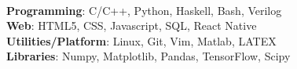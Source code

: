 \ifdefined\ONEPAGE
\\
\textbf{Programming}: C/C++, Python, Haskell, Bash, Verilog\\
\textbf{Web}: HTML5, CSS, Javascript, SQL, React Native\\
\textbf{Utilities/Platform}: Linux, Git, Vim, Matlab, LATEX \\
\textbf{Libraries}: Numpy, Matplotlib, Pandas, TensorFlow, Scipy\\
\else
\fi
